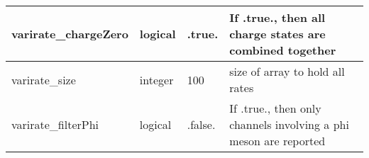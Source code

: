 \documentclass{article}
\begin{document}
\begin{longtable}{llll}
varirate\_chargeZero & \begin{minipage}[t]{2cm}logical\end{minipage} & \begin{minipage}[t]{2cm}.true.\end{minipage} & \begin{minipage}[t]{12cm}If .true., then all charge states are combined together\end{minipage}\\*
\midrule
varirate\_size & \begin{minipage}[t]{2cm}integer\end{minipage} & \begin{minipage}[t]{2cm}100\end{minipage} & \begin{minipage}[t]{12cm}size of array to hold all rates\end{minipage}\\*
\midrule
varirate\_filterPhi & \begin{minipage}[t]{2cm}logical\end{minipage} & \begin{minipage}[t]{2cm}.false.\end{minipage} & \begin{minipage}[t]{12cm}If .true., then only channels involving a phi meson are reported\end{minipage}\\*
\bottomrule
\end{longtable}
{ }



\end{document}

